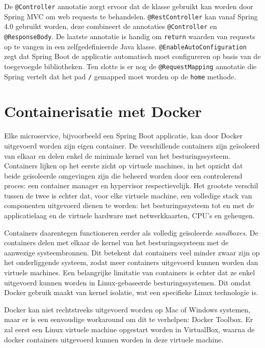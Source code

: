 De \texttt{@Controller} annotatie zorgt ervoor dat de klasse gebruikt kan worden door Spring MVC om web requests te behandelen. \texttt{@RestController} kan vanaf Spring 4.0 gebruikt worden, deze combineert de annotaties \texttt{@Controller} en \texttt{@ResponseBody}. De laatste annotatie is handig om \texttt{return} waarden van requests op te vangen in een zelfgedefinieerde Java klasse. \texttt{@EnableAutoConfiguration} zegt dat Spring Boot de applicatie automatisch moet configureren op basis van de toegevoegde bibliotheken. Ten slotte is er nog de \texttt{@RequestMapping} annotatie die Spring vertelt dat het pad \texttt{/} gemapped moet worden op de \texttt{home} methode.

\section{Containerisatie met Docker}
\label{sec:docker}

Elke microservice, bijvoorbeeld een Spring Boot applicatie, kan door Docker uitgevoerd worden zijn eigen container. De verschillende containers zijn geïsoleerd van elkaar en delen enkel de minimale kernel van het besturingssysteem. Containers lijken op het eerste zicht op virtuele machines, in het opzicht dat beide geïsoleerde omgevingen zijn die beheerd worden door een controlerend proces: een container manager en hypervisor respectievelijk. Het grootste verschil tussen de twee is echter dat, voor elke virtuele machine, een volledige stack van componenten uitgevoerd dienen te worden: het besturingssysteem tot en met de applicatielaag en de virtuele hardware met netwerkkaarten, CPU's en geheugen.

Containers daarentegen functioneren eerder als volledig geïsoleerde \textit{sandboxes}. De containers delen met elkaar de kernel van het besturingssysteem met de aanwezige systeembronnen. Dit betekent dat containers veel minder zwaar zijn op het onderliggende systeem, zodat meer containers uitgevoerd kunnen worden dan virtuele machines. Een belangrijke limitatie van containers is echter dat ze enkel uitgevoerd kunnen worden in Linux-gebaseerde besturingssystemen. Dit omdat Docker gebruik maakt van kernel isolatie, wat een specifieke Linux technologie is.

Docker kan niet rechtstreeks uitgevoerd worden op Mac of Windows systemen, maar er is een eenvoudige workaround om dit te verhelpen: Docker Toolbox. Er zal eerst een Linux virtuele machine opgestart worden in VirtualBox, waarna de docker containers uitgevoerd kunnen worden in deze virtuele machine.

